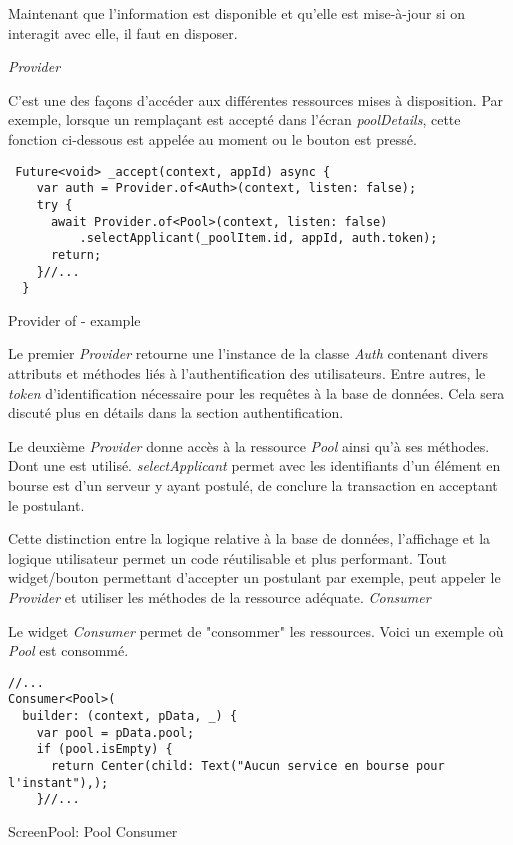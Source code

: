 Maintenant que l'information est disponible et qu'elle est mise-à-jour si on interagit avec elle, il faut en disposer. 

\emph{Provider}

C'est une des façons d'accéder aux différentes ressources mises à disposition. Par exemple, lorsque un remplaçant est accepté dans l'écran \textit{poolDetails}, cette fonction ci-dessous est appelée au moment ou le bouton est pressé.

\begin{listing}[!h]
\begin{verbatim}
 Future<void> _accept(context, appId) async {
    var auth = Provider.of<Auth>(context, listen: false);
    try {
      await Provider.of<Pool>(context, listen: false)
          .selectApplicant(_poolItem.id, appId, auth.token);
      return;
    }//...
  }
\end{verbatim}
\caption{Provider of - example}
\label{code:providerOf}
\end{listing}

Le premier \textit{Provider} retourne une l'instance de la classe \textit{Auth} contenant divers attributs et méthodes liés à l'authentification des utilisateurs. Entre autres, le \textit{token} d'identification nécessaire pour les requêtes à la base de données. Cela sera discuté plus en détails dans la section authentification. 

Le deuxième \textit{Provider} donne accès à la ressource \textit{Pool} ainsi qu'à ses méthodes. Dont une est utilisé. \textit{selectApplicant} permet avec les identifiants d'un élément en bourse est d'un serveur y ayant postulé, de conclure la transaction en acceptant le postulant. 

Cette distinction entre la logique relative à la base de données, l'affichage et la logique utilisateur permet un code réutilisable et plus performant. Tout widget/bouton permettant d'accepter un postulant par exemple, peut appeler le \textit{Provider} et utiliser les méthodes de la ressource adéquate.
\newpage
\emph{Consumer}

Le widget \textit{Consumer} permet de "consommer" les ressources. Voici un exemple où \textit{Pool} est consommé. 

\begin{listing}[!h]
\begin{verbatim}
//...
Consumer<Pool>(
  builder: (context, pData, _) {
    var pool = pData.pool;
    if (pool.isEmpty) {
      return Center(child: Text("Aucun service en bourse pour l'instant"),);
    }//...
\end{verbatim}
\caption{ScreenPool: Pool Consumer}
\label{code:poolConsumer}
\end{listing}

